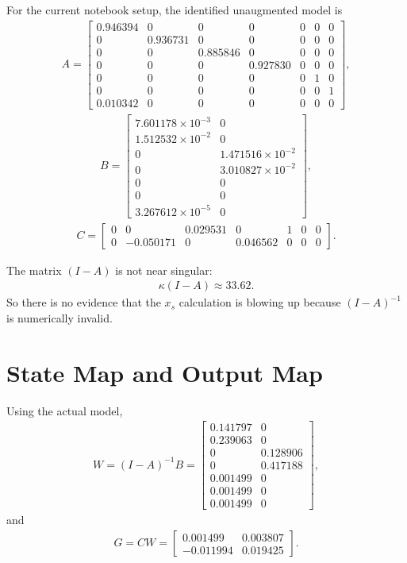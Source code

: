 \documentclass[11pt]{article}
\begin{document}
For the current notebook setup, the identified unaugmented model is
\begin{align}
A =
\begin{bmatrix}
0.946394 & 0 & 0 & 0 & 0 & 0 & 0 \\
0 & 0.936731 & 0 & 0 & 0 & 0 & 0 \\
0 & 0 & 0.885846 & 0 & 0 & 0 & 0 \\
0 & 0 & 0 & 0.927830 & 0 & 0 & 0 \\
0 & 0 & 0 & 0 & 0 & 1 & 0 \\
0 & 0 & 0 & 0 & 0 & 0 & 1 \\
0.010342 & 0 & 0 & 0 & 0 & 0 & 0
\end{bmatrix},
\end{align}
\begin{align}
B =
\begin{bmatrix}
7.601178\times 10^{-3} & 0 \\
1.512532\times 10^{-2} & 0 \\
0 & 1.471516\times 10^{-2} \\
0 & 3.010827\times 10^{-2} \\
0 & 0 \\
0 & 0 \\
3.267612\times 10^{-5} & 0
\end{bmatrix},
\end{align}
\begin{align}
C =
\begin{bmatrix}
0 & 0 & 0.029531 & 0 & 1 & 0 & 0 \\
0 & -0.050171 & 0 & 0.046562 & 0 & 0 & 0
\end{bmatrix}.
\end{align}

The matrix $(I-A)$ is not near singular:
\begin{align}
\kappa(I-A) \approx 33.62.
\end{align}
So there is no evidence that the $x_s$ calculation is blowing up because $(I-A)^{-1}$ is numerically invalid.

\section{State Map and Output Map}

Using the actual model,
\begin{align}
W = (I-A)^{-1}B =
\begin{bmatrix}
0.141797 & 0 \\
0.239063 & 0 \\
0 & 0.128906 \\
0 & 0.417188 \\
0.001499 & 0 \\
0.001499 & 0 \\
0.001499 & 0
\end{bmatrix},
\end{align}
and
\begin{align}
G = CW =
\begin{bmatrix}
0.001499 & 0.003807 \\
-0.011994 & 0.019425
\end{bmatrix}.
\end{align}
\end{document}
